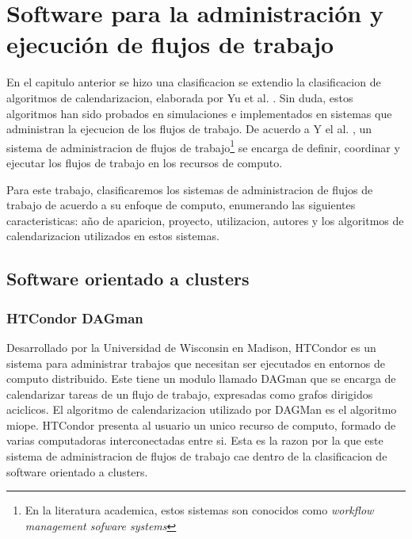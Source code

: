 \chapter{Software para la administración y ejecución de flujos de trabajo}

En el capitulo anterior se hizo una clasificacion se extendio la clasificacion de algoritmos de calendarizacion, elaborada por Yu et al. \cite{yu2008workflow}. Sin duda, estos algoritmos han sido probados en simulaciones e implementados en sistemas que administran la  ejecucion de los flujos de trabajo. De acuerdo a Y el al. \cite{yu2008workflow}, un sistema de administracion de flujos de trabajo\footnote{En la literatura academica, estos sistemas son conocidos como \emph{workflow management sofware systems}} se encarga de definir, coordinar y ejecutar los flujos de trabajo en los recursos de computo.

Para este trabajo, clasificaremos los sistemas de administracion de flujos de trabajo de acuerdo a su enfoque de computo, enumerando las siguientes caracteristicas: año de aparicion, proyecto, utilizacion, autores y los algoritmos de calendarizacion utilizados en estos sistemas.

\section{Software orientado a clusters}



\subsection{HTCondor DAGman}
Desarrollado por la Universidad de Wisconsin en Madison, HTCondor es un sistema para administrar trabajos que necesitan ser ejecutados en entornos de computo distribuido. Este tiene un modulo llamado DAGman que se encarga de calendarizar tareas de un flujo de trabajo, expresadas como grafos dirigidos aciclicos. El algoritmo de calendarizacion utilizado por DAGMan es el algoritmo miope. 
HTCondor presenta al usuario un unico recurso de computo, formado de varias computadoras interconectadas entre si. Esta es la razon por la que este sistema de administracion de flujos de trabajo cae dentro de la clasificacion de software orientado a clusters.

